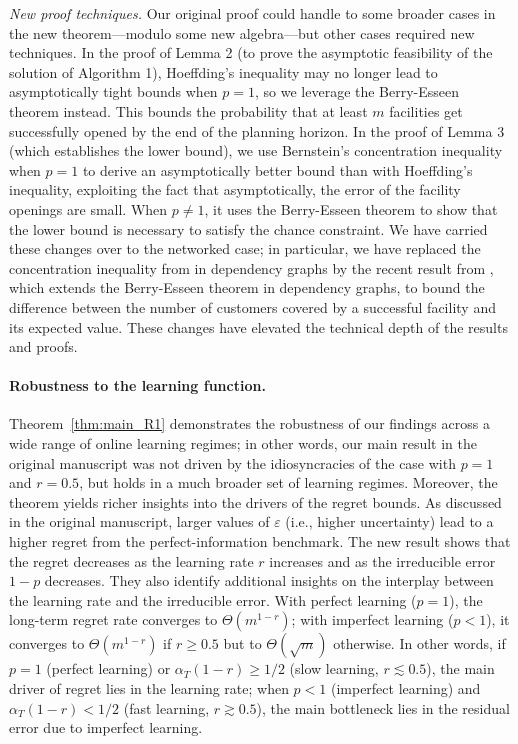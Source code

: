 \documentclass[11pt]{article}
\begin{document}
\textit{New proof techniques.}
Our original proof could handle to some broader cases in the new theorem---modulo some new algebra---but other cases required new techniques. In the proof of Lemma 2 (to prove the asymptotic feasibility of the solution of Algorithm 1), Hoeffding's inequality may no longer lead to asymptotically tight bounds when $p=1$, so we leverage the Berry-Esseen theorem instead. This bounds the probability that at least $m$ facilities get successfully opened by the end of the planning horizon. In the proof of Lemma 3 (which establishes the lower bound), we use Bernstein's concentration inequality when $p=1$ to derive an asymptotically better bound than with Hoeffding's inequality, exploiting the fact that asymptotically, the error of the facility openings are small. When $p\neq1$, it uses the Berry-Esseen theorem to show that the lower bound is necessary to satisfy the chance constraint. We have carried these changes over to the networked case; in particular, we have replaced the concentration inequality from \cite{janson2004large} in dependency graphs by the recent result from \cite{janisch2024berry}, which extends the Berry-Esseen theorem in dependency graphs, to bound the difference between the number of customers covered by a successful facility and its expected value. These changes have elevated the technical depth of the results and proofs.

\paragraph{Robustness to the learning function.}

Theorem~\ref{thm:main_R1} demonstrates the robustness of our findings across a wide range of online learning regimes; in other words, our main result in the original manuscript was not driven by the idiosyncracies of the case with $p=1$ and $r=0.5$, but holds in a much broader set of learning regimes. Moreover, the theorem yields richer insights into the drivers of the regret bounds. As discussed in the original manuscript, larger values of $\varepsilon$ (i.e., higher uncertainty) lead to a higher regret from the perfect-information benchmark. The new result shows that the regret decreases as the learning rate $r$ increases and as the irreducible error $1-p$ decreases. They also identify additional insights on the interplay between the learning rate and the irreducible error. With perfect learning ($p=1$), the long-term regret rate converges to $\Theta\left(m^{1-r}\right)$; with imperfect learning ($p<1$), it converges to $\Theta\left(m^{1-r}\right)$ if $r\geq0.5$ but to $\Theta(\sqrt m)$ otherwise. In other words, if $p=1$ (perfect learning) or $\alpha_T(1-r)\geq1/2$ (slow learning, $r\lesssim0.5$), the main driver of regret lies in the learning rate; when $p<1$ (imperfect learning) and $\alpha_T(1-r)<1/2$ (fast learning, $r\gtrsim0.5$), the main bottleneck lies in the residual error due to imperfect learning.
\end{document}
